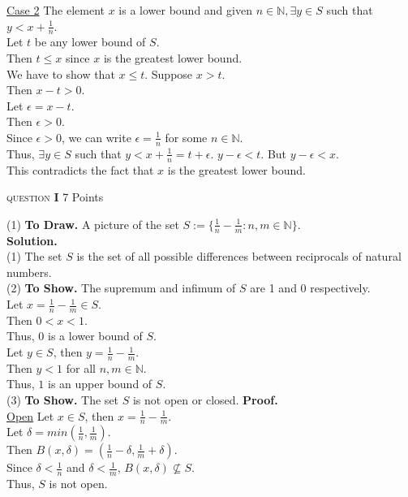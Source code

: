 \documentclass[11pt]{article}
\newcommand{\problem
}[2]{
\begin{mdframed}
    \textsc{question} \textbf{#1} \hfill #2
\end{mdframed}
}
\begin{document}
\noindent \underline{Case 2} The element $x$ is a lower bound and given $n \in \mathbb{N}, \exists y \in S$ such that $y < x + \frac{1}{n}$.\\
Let $t$ be any lower bound of $S$.\\
Then $t \leq x$ since $x$ is the greatest lower bound.\\
We have to show that $x \leq t$. Suppose $x > t$.\\
Then $x - t > 0$.\\
Let $\epsilon = x - t$.\\
Then $\epsilon > 0$.\\
Since $\epsilon > 0$, we can write $\epsilon = \frac{1}{n}$ for some $n \in \mathbb{N}$.\\
Thus, $\exists y \in S$ such that $y < x + \frac{1}{n} = t + \epsilon$. $y - \epsilon < t$. But $y - \epsilon < x$.\\
This contradicts the fact that $x$ is the greatest lower bound.\\


\problem{I}{7 Points}
(1) \textbf{To Draw. } A picture of the set $S :=  \{ \frac{1}{n} - \frac{1}{m} : n, m \in \mathbb{N} \}$.\\
\textbf{Solution.} \\
(1) The set $S$ is the set of all possible differences between reciprocals of natural numbers.\\
(2) \textbf{To Show. } The supremum and infimum of $S$ are 1 and 0 respectively.\\
Let $x = \frac{1}{n} - \frac{1}{m} \in S$.\\
Then $0 < x < 1$.\\
Thus, $0$ is a lower bound of $S$.\\
Let $y \in S$, then $y = \frac{1}{n} - \frac{1}{m}$.\\
Then $y < 1$ for all $n, m \in \mathbb{N}$.\\
Thus, $1$ is an upper bound of $S$.\\

(3) \textbf{To Show. } The set $S$ is not open or closed.
\textbf{Proof.} \\
\underline{Open} Let $x \in S$, then $x = \frac{1}{n} - \frac{1}{m}$.\\
Let $\delta = min(\frac{1}{n}, \frac{1}{m})$.\\
Then $B(x, \delta) = (\frac{1}{n} - \delta, \frac{1}{m} + \delta)$.\\
Since $\delta < \frac{1}{n}$ and $\delta < \frac{1}{m}$, $B(x, \delta) \not\subseteq S$.\\
Thus, $S$ is not open.\\
\end{document}
